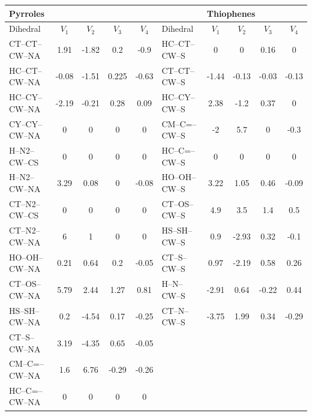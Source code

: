 \documentclass[12pt]{report}
\begin{document}
\begin{table}[hb]
\footnotesize
\begin{tabular}{lcccc|lcccc}
\toprule
\multicolumn{4}{l}{\hspace*{3.25cm}Pyrroles} &&& \multicolumn{4}{l}{\hspace*{0.25cm}Thiophenes} \\
\midrule
Dihedral & $V_1$ & $V_2$ & $V_3$ & $V_4$ & Dihedral & $V_1$ & $V_2$ & $V_3$ & $V_4$\\
\midrule
CT--CT--CW--NA & 1.91 & -1.82 & 0.2 & -0.9 & HC--CT--CW--S & 0 & 0 & 0.16 & 0\\
HC--CT--CW--NA & -0.08 & -1.51 & 0.225 & -0.63 & CT--CT--CW--S & -1.44 & -0.13 & -0.03 & -0.13\\
HC--CY--CW--NA & -2.19 & -0.21 & 0.28 & 0.09 & HC--CY--CW--S & 2.38 & -1.2 & 0.37 & 0\\
CY--CY--CW--NA & 0 & 0 & 0 & 0 & CM--C=--CW--S & -2 & 5.7 & 0 & -0.3\\
H--N2--CW--CS & 0 & 0 & 0 & 0 & HC--C=--CW--S & 0 & 0 & 0 & 0\\
H--N2--CW--NA & 3.29 & 0.08 & 0 & -0.08 & HO--OH--CW--S & 3.22 & 1.05 & 0.46 & -0.09\\
CT--N2--CW--CS & 0 & 0 & 0 & 0 & CT--OS--CW--S & 4.9 & 3.5 & 1.4 & 0.5\\
CT--N2--CW--NA & 6 & 1 & 0 & 0 & HS--SH--CW--S & 0.9 & -2.93 & 0.32 & -0.1\\
HO--OH--CW--NA & 0.21 & 0.64 & 0.2 & -0.05 & CT--S--CW--S & 0.97 & -2.19 & 0.58 & 0.26\\
CT--OS--CW--NA & 5.79 & 2.44 & 1.27 & 0.81 & H--N--CW--S & -2.91 & 0.64 & -0.22 & 0.44\\
HS--SH--CW--NA & 0.2 & -4.54 & 0.17 & -0.25 & CT--N--CW--S & -3.75 & 1.99 & 0.34 & -0.29\\
CT--S--CW--NA & 3.19 & -4.35 & 0.65 & -0.05 &  &  &  &  & \\
CM--C=--CW--NA & 1.6 & 6.76 & -0.29 & -0.26 &  &  &  &  & \\
HC--C=--CW--NA & 0 & 0 & 0 & 0 &  &  &  &  & \\
\bottomrule
\end{tabular}
\end{table}
\end{document}
